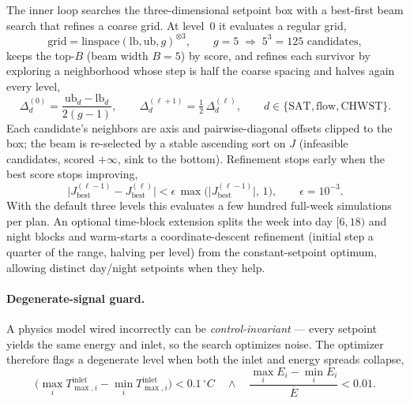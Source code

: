 \documentclass[11pt]{article}
\newcommand{\degC}{\ensuremath{^{\circ}}C}
\begin{document}
The inner loop searches the three-dimensional setpoint box with a best-first beam search
that refines a coarse grid. At level~0 it evaluates a regular grid,
\begin{equation}
\mathrm{grid} = \mathrm{linspace}(\mathrm{lb},\mathrm{ub},g)^{\otimes 3},
\qquad g=5 \;\Rightarrow\; 5^3 = 125 \text{ candidates},
\label{eq:grid}
\end{equation}
keeps the top-\(B\) (beam width \(B=5\)) by score, and refines each survivor by exploring a
neighborhood whose step is half the coarse spacing and halves again every level,
\begin{equation}
\Delta^{(0)}_d = \frac{\mathrm{ub}_d-\mathrm{lb}_d}{2(g-1)},
\qquad
\Delta^{(\ell+1)}_d = \tfrac{1}{2}\,\Delta^{(\ell)}_d,
\qquad d\in\{\mathrm{SAT},\mathrm{flow},\mathrm{CHWST}\}.
\label{eq:refstep}
\end{equation}
Each candidate's neighbors are axis and pairwise-diagonal offsets clipped to the box; the
beam is re-selected by a stable ascending sort on \(J\) (infeasible candidates, scored
\(+\infty\), sink to the bottom). Refinement stops early when the best score stops
improving,
\begin{equation}
\big\lvert J^{(\ell-1)}_{\mathrm{best}} - J^{(\ell)}_{\mathrm{best}}\big\rvert
< \epsilon\,\max\!\big(\lvert J^{(\ell-1)}_{\mathrm{best}}\rvert,\,1\big),
\qquad \epsilon = 10^{-3}.
\label{eq:earlystop}
\end{equation}
With the default three levels this evaluates a few hundred full-week simulations per plan.
An optional time-block extension splits the week into day \([6,18)\) and night blocks and
warm-starts a coordinate-descent refinement (initial step a quarter of the range, halving
per level) from the constant-setpoint optimum, allowing distinct day/night setpoints when
they help.

\paragraph{Degenerate-signal guard.} A physics model wired incorrectly can be
\emph{control-invariant} --- every setpoint yields the same energy and inlet, so the search
optimizes noise. The optimizer therefore flags a degenerate level when both the inlet and
energy spreads collapse,
\begin{equation}
\Big(\max_i T^{\mathrm{inlet}}_{\max,i} - \min_i T^{\mathrm{inlet}}_{\max,i}\Big) < 0.1\,\degC
\quad\wedge\quad
\frac{\max_i E_i - \min_i E_i}{\overline{E}} < 0.01 .
\label{eq:degen}
\end{equation}
\end{document}
